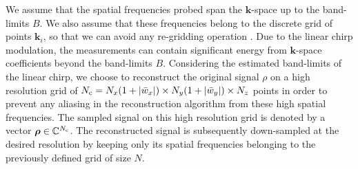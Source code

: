 \documentclass[10pt,draftcls, onecolumn]{IEEEtran}
\begin{document}
We assume that the spatial frequencies probed span the $\bm{k}$-space up to the band-limits $B$. We also assume that these frequencies belong to the discrete grid of points $\bm{k}_{i}$, so that we can avoid any re-gridding operation \cite{haake99}. Due to the linear chirp modulation, the measurements can contain significant energy from $\bm{k}$-space coefficients beyond the band-limits $B$. Considering the estimated band-limits of the linear chirp, we choose to reconstruct the original signal $\rho$ on a high resolution grid of $N_{\rm c}=N_x(1+\vert\bar{w}_x\vert)\times N_y(1+\vert\bar{w}_y\vert)\times N_z$ points in order to prevent any aliasing in the reconstruction algorithm from these high spatial frequencies. The sampled signal on this high resolution grid is denoted by a vector $\bm{\rho} \in \mathbb{C}^{N_{\rm c}}$. The reconstructed signal is subsequently down-sampled at the desired resolution by keeping only its spatial frequencies belonging to the previously defined grid of size $N$.
\end{document}
